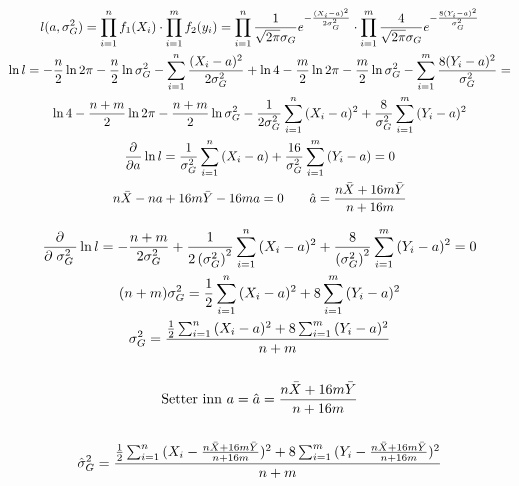 \begin{gather*}
	l(a, \sigma_G^2) = \prod_{i = 1}^{n}{f_1(X_i)} \cdot \prod_{i = 1}^{m}{f_2(y_i)}
	=
	\prod_{i = 1}^{n}{\frac{1}{\sqrt{2 \pi} \sigma_G} e^{-\frac{(X_i - a)^2}{2 \sigma_G^2}}}
	\cdot
	\prod_{i = 1}^{m}{\frac{4}{\sqrt{2 \pi} \sigma_G} e^{-\frac{8 (Y_i - a)^2}{\sigma_G^2}}}
	\\
	\ln{l} = -\frac{n}{2} \ln{2 \pi} - \frac{n}{2} \ln{\sigma_G^2} - \sum_{i = 1}^n{\frac{(X_i - a)^2}{2 \sigma_G^2}}
	+
	\ln{4} - \frac{m}{2} \ln{2 \pi} - \frac{m}{2} \ln{\sigma_G^2} - \sum_{i = 1}^m{\frac{8 (Y_i - a)^2}{\sigma_G^2}}
	=
	\\
	\ln{4} - \frac{n + m}{2} \ln{2 \pi} - \frac{n + m}{2} \ln{\sigma_G^2}
	-
	\frac{1}{2 \sigma_G^2} \sum_{i = 1}^n{(X_i - a)^2} + \frac{8}{\sigma_G^2} \sum_{i = 1}^m{(Y_i - a)^2}
	\\
	\frac{\partial^{} }{\partial a^{}} \ln{l} = \frac{1}{\sigma_G^2} \sum_{i = 1}^n{(X_i - a)} + \frac{16}{\sigma_G^2} \sum_{i = 1}^m{(Y_i - a)} = 0
	\\
	n \bar X - n a + 16 m \bar Y - 16 m a = 0
	\qquad
	\hat a = \frac{n \bar X + 16 m \bar Y}{n + 16 m}
\end{gather*}


\begin{gather*}
	\frac{\partial^{} }{\partial \left.\sigma_G^2\right.^{}} \ln{l}
	=
	- \frac{n + m}{2 \sigma_G^2} + \frac{1}{2 \left(\sigma_G^2\right)^2} \sum_{i = 1}^n{(X_i - a)^2}
	+
	\frac{8}{\left(\sigma_G^2\right)^2} \sum_{i = 1}^m{(Y_i - a)^2} = 0
	\\
	(n + m) \sigma_G^2 = \frac{1}{2} \sum_{i = 1}^n{(X_i - a)^2}
	+
	8 \sum_{i = 1}^m{(Y_i - a)^2}
	\\
	\sigma_G^2 = \frac{\frac{1}{2} \sum_{i = 1}^n{(X_i - a)^2}
	+
	8 \sum_{i = 1}^m{(Y_i - a)^2}}{n + m}
	\\
	\\
	\text{Setter inn } a = \hat a = \frac{n \bar X + 16 m \bar Y}{n + 16 m}
	\\
	\\
	\hat \sigma_G^2 = \frac{\frac{1}{2} \sum_{i = 1}^n{(X_i - \frac{n \bar X + 16 m \bar Y}{n + 16 m})^2}
	+
	8 \sum_{i = 1}^m{(Y_i - \frac{n \bar X + 16 m \bar Y}{n + 16 m})^2}}{n + m}
\end{gather*}


